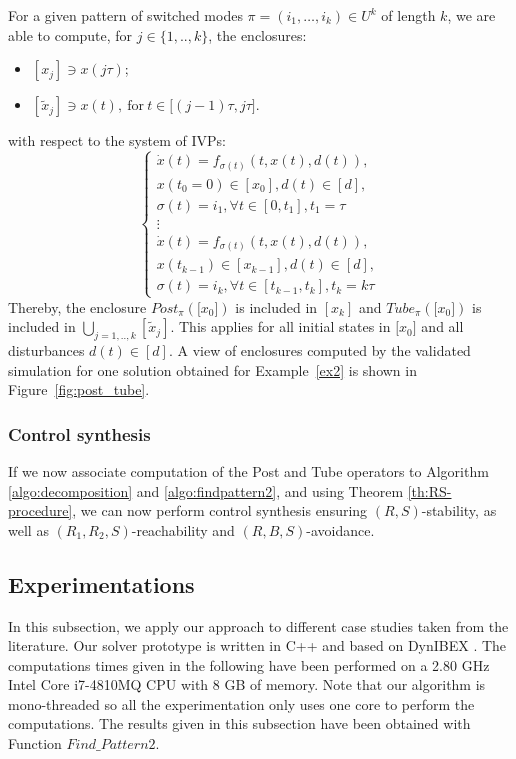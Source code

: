 For a given pattern of switched modes $\pi = (i_1,\dots,i_k) \in U^k$
of length $k$, we are able to compute, for $j \in \{1,..,k\}$, the
enclosures:
\begin{itemize}
\item $[x_j] \ni x(j\tau)$;
\item $[\tilde{x}_j] \ni x(t), \ \text{for} \ t \in \lbrack
  (j-1)\tau,j\tau\rbrack$.
\end{itemize}
with respect to the system of IVPs:
\begin{equation}
  \left\{
    \begin{array}{c}
      \dot x(t) = f_{\sigma (t)}(t,x(t),d(t)),\\
      \nonumber x(t_0=0) \in [x_0] , d(t) \in [d],\\
      \sigma(t) = i_1, \forall t \in [0,t_1], t_1=\tau\\
      \vdots\\
      \dot x(t) = f_{\sigma (t)}(t,x(t),d(t)),\\
      \nonumber x(t_{k-1}) \in [x_{k-1}], d(t) \in [d],\\
      \sigma(t) = i_k, \forall t \in [t_{k-1},t_k], t_k=k\tau
    \end{array}
  \right.
\end{equation}
Thereby, the enclosure $Post_{\pi}(\lbrack x_0 \rbrack)$ is included
in $[x_k]$ and $Tube_{\pi}(\lbrack x_0 \rbrack)$ is included in
$\bigcup_{j=1,..,k} [\tilde{x}_j]$. This applies for all initial
states in $\lbrack x_0 \rbrack$ and all disturbances $d(t) \in [d]$. A
view of enclosures computed by the validated simulation for one
solution obtained for Example~\ref{ex2} is shown in
Figure~\ref{fig:post_tube}.



\subsubsection{Control synthesis}

If we now associate computation of the Post and Tube operators
to Algorithm \ref{algo:decomposition} and \ref{algo:findpattern2}, 
and using Theorem \ref{th:RS-procedure}, we can now perform control synthesis
ensuring $(R,S)$-stability, as well as $(R_1,R_2,S)$-reachability
and $(R,B,S)$-avoidance. 


\subsection{Experimentations}
\label{sec:experimentations}
%
In this subsection, we apply our approach to different case studies taken
from the literature.  Our solver prototype is written in C++ and based
on DynIBEX \cite{dynibex}.  The computations times given in the
following have been performed on a 2.80 GHz Intel Core i7-4810MQ CPU
with 8 GB of memory. Note that our algorithm is mono-threaded so all
the experimentation only uses one core to perform the computations.
The results given in this subsection have been obtained with Function
$Find\_Pattern2$.

